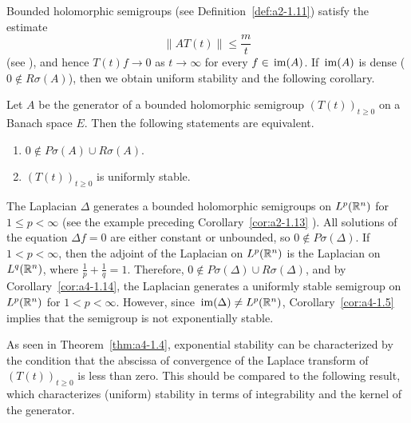 Bounded holomorphic semigroups (see Definition~\ref{def:a2-1.11}) satisfy the estimate
\[\|AT(t)\| \leq \frac{m}{t}\]
(see \textcite[p.33]{goldstein:1985a}), and hence $T(t)f \to 0$ as $t \to \infty$
for every $f \in \mathop{}\mathrm{im}(A)$. 
If\/ $\mathop{}\mathrm{im}(A)$ is dense (\ie $0 \not\in R\sigma(A)$), then we obtain
uniform stability and the following corollary.
\begin{corollary}\label{cor:a4-1.14}
Let $A$ be the generator of a bounded holomorphic
semigroup $(T(t))_{t \geq 0}$ on a Banach space $E$. 
Then the following statements are equivalent.
\begin{enumerate}[\upshape (a)]
\item 
$0 \not\in P\sigma(A) \cup R\sigma(A)$.

\item 
$(T(t))_{t \geq 0}$ is uniformly stable.

\end{enumerate}
\end{corollary}
\begin{example}\label{ex:a4-15}
The Laplacian $\Delta$ generates a bounded holomorphic semigroups on $L^{p}(\mathbb{R}^{n})$ for $1 \leq p < \infty$ (see the example preceding
Corollary~\ref{cor:a2-1.13} ).
All solutions of the equation $\Delta f = 0$ are either constant
or unbounded, so $0 \not\in P\sigma(\Delta)$. 
If\/ $1 < p < \infty$, then the adjoint
of the Laplacian on $L^{p}(\mathbb{R}^{n})$ is the Laplacian on $L^{q}(\mathbb{R}^{n})$, where
$\frac{1}{p} + \frac{1}{q} = 1$. 
Therefore, $0 \not\in P\sigma(\Delta) \cup R\sigma(\Delta)$, and by Corollary~\ref{cor:a4-1.14},
the Laplacian generates a uniformly stable semigroup on  $L^{p}(\mathbb{R}^{n})$
for $1 < p < \infty$. However, since $\mathop{}\mathrm{im}( \Delta) \not= L^{p}(\mathbb{R}^{n})$, Corollary~\ref{cor:a4-1.5} implies that the semigroup is not exponentially stable. %
\end{example}
As seen in Theorem~\ref{thm:a4-1.4}, exponential stability can be characterized by the condition that the abscissa of convergence of the Laplace transform of\/ $(T(t))_{t \geq 0}$ is less than zero. 
This should be compared to the following result, which characterizes (uniform) stability in terms of integrability and the kernel of the generator.
